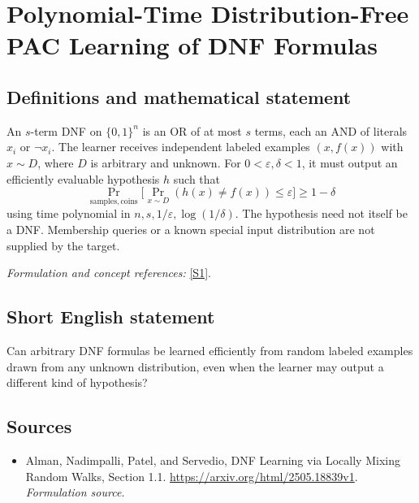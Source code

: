 \documentclass[11pt]{article}
\begin{document}
\section*{\texorpdfstring{Polynomial-Time Distribution-Free PAC Learning of DNF Formulas}{Polynomial-Time Distribution-Free PAC Learning of DNF Formulas}}\label{30006796}
\subsection{Definitions and mathematical statement}
An $s$-term DNF on $\{0,1\}^n$ is an OR of at most $s$ terms, each an AND of literals $x_i$ or $\neg x_i$. The learner receives independent labeled examples $(x,f(x))$ with $x\sim D$, where $D$ is arbitrary and unknown. For $0<{\varepsilon},\delta<1$, it must output an efficiently evaluable hypothesis $h$ such that
\[
 \Pr_{\mathrm{samples,coins}}\bigl[\Pr_{x\sim D}(h(x)\ne f(x))\le{\varepsilon}\bigr]\ge1-\delta
\]
using time polynomial in $n,s,1/{\varepsilon},\log(1/\delta)$. The hypothesis need not itself be a DNF. Membership queries or a known special input distribution are not supplied by the target.
\par\smallskip\textit{Formulation and concept references:} \href{https://arxiv.org/html/2505.18839v1}{[S1]}.

\subsection{Short English statement}
Can arbitrary DNF formulas be learned efficiently from random labeled examples drawn from any unknown distribution, even when the learner may output a different kind of hypothesis?
\subsection{Sources}
\begin{itemize}
\item[S1]Alman, Nadimpalli, Patel, and Servedio, DNF Learning via Locally Mixing Random Walks, Section 1.1.
\url{https://arxiv.org/html/2505.18839v1}.
\textit{Formulation source.}
\end{itemize}
\end{document}
